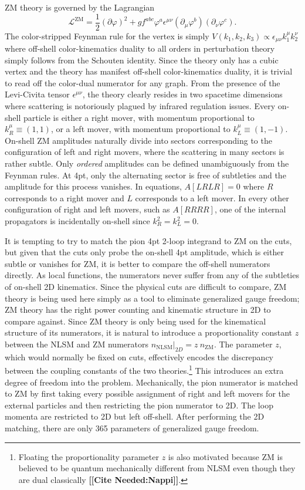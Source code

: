 \documentclass[11pt,letter]{article}
\def\be{\begin{equation}}
\def\ee{\end{equation}}
\newcommand{\citepls}[1]{{\bf\color{red}[[Cite Needed:#1]]}}
\begin{document}
ZM theory is governed by the Lagrangian
\be
\label{eq:ZMLagrangian}
\mathcal{L}^{\text{ZM}} = \frac{1}{2}(\partial \varphi)^2 + g f^{abc} \varphi^a \epsilon^{\mu\nu}(\partial_\mu \varphi^b)( \partial_\nu \varphi^c) .
\ee
The color-stripped Feynman rule for the vertex is simply $V(k_1, k_2, k_3) \propto \epsilon_{\mu\nu}k_1^\mu k_2^\nu$ where off-shell color-kinematics duality to all orders in perturbation theory simply follows from the Schouten identity.
Since the theory only has a cubic vertex and the theory has manifest off-shell color-kinematics duality, it is trivial to read off the color-dual numerator for any graph.
From the presence of the Levi-Civita tensor $\epsilon^{\mu\nu}$, the theory clearly resides in two spacetime dimensions where scattering is notoriously plagued by infrared regulation issues.
Every on-shell particle is either a right mover, with momentum proportional to $k_R^\mu \equiv (1,1)$, or a left mover, with momentum proportional to $k_L^\mu \equiv (1,-1)$.
On-shell ZM amplitudes naturally divide into sectors corresponding to the configuration of left and right movers, where the scattering in many sectors is rather subtle.
Only \emph{ordered} amplitudes can be defined unambiguously from the Feynman rules.
At 4pt, only the alternating sector is free of subtleties and the amplitude for this process vanishes.
In equations, $A[LRLR]=0$ where $R$ corresponds to a right mover and $L$ corresponds to a left mover.
In every other configuration of right and left movers, such as $A[RRRR]$, one of the internal propagators is incidentally on-shell since $k_R^2=k_L^2=0$.

It is tempting to try to match the pion 4pt 2-loop integrand to ZM on the cuts, but given that the cuts only probe the on-shell 4pt amplitude, which is either subtle or vanishes for ZM, it is better to compare the off-shell numerators directly.
As local functions, the numerators never suffer from any of the subtleties of on-shell 2D kinematics.
Since the physical cuts are difficult to compare, ZM theory is being used here simply as a tool to eliminate generalized gauge freedom; ZM theory has the right power counting and kinematic structure in 2D to compare against.
Since ZM theory is only being used for the kinematical structure of its numerators, it is natural to introduce a proportionality constant $z$ between the NLSM and ZM numerators $n_\text{NLSM} \vert_{2D} = z ~ n_\text{ZM}$.
The parameter $z$, which would normally be fixed on cuts, effectively encodes the discrepancy between the coupling constants of the two theories.\footnote{Floating the proportionality parameter $z$ is also motivated because ZM is believed to be quantum mechanically different from NLSM even though they are dual classically \citepls{Nappi}.}
This introduces an extra degree of freedom into the problem.
Mechanically, the pion numerator is matched to ZM by first taking every possible assignment of right and left movers for the external particles and then restricting the pion numerator to 2D.
The loop momenta are restricted to 2D but left off-shell.
After performing the 2D matching, there are only 365 parameters of generalized gauge freedom.
\end{document}
